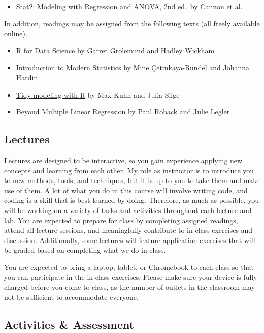 \documentclass[
  letterpaper,
  DIV=11,
  numbers=noendperiod]{scrartcl}
\providecommand{\tightlist}{%
  \setlength{\itemsep}{0pt}\setlength{\parskip}{0pt}}
\begin{document}
\begin{itemize}
\tightlist
\item
  Stat2: Modeling with Regression and ANOVA, 2nd ed.~by Cannon et al.
\end{itemize}

In addition, readings may be assigned from the following texts (all
freely available online).

\begin{itemize}
\item
  \href{https://r4ds.had.co.nz/}{R for Data Science} by Garret Grolemund
  and Hadley Wickham
\item
  \href{https://openintro-ims.netlify.app/}{Introduction to Modern
  Statistics} by Mine Çetinkaya-Rundel and Johanna Hardin
\item
  \href{https://www.tmwr.org/}{Tidy modeling with R} by Max Kuhn and
  Julia Silge
\item
  \href{https://bookdown.org/roback/bookdown-BeyondMLR/}{Beyond Multiple
  Linear Regression} by Paul Roback and Julie Legler
\end{itemize}

\subsection{Lectures}\label{lectures}

Lectures are designed to be interactive, so you gain experience applying
new concepts and learning from each other. My role as instructor is to
introduce you to new methods, tools, and techniques, but it is up to you
to take them and make use of them. A lot of what you do in this course
will involve writing code, and coding is a skill that is best learned by
doing. Therefore, as much as possible, you will be working on a variety
of tasks and activities throughout each lecture and lab. You are
expected to prepare for class by completing assigned readings, attend
all lecture sessions, and meaningfully contribute to in-class exercises
and discussion. Additionally, some lectures will feature application
exercises that will be graded based on completing what we do in class.

You are expected to bring a laptop, tablet, or Chromebook to each class
so that you can participate in the in-class exercises. Please make sure
your device is fully charged before you come to class, as the number of
outlets in the classroom may not be sufficient to accommodate everyone.

\subsection{Activities \& Assessment}\label{activities-assessment}
\end{document}
